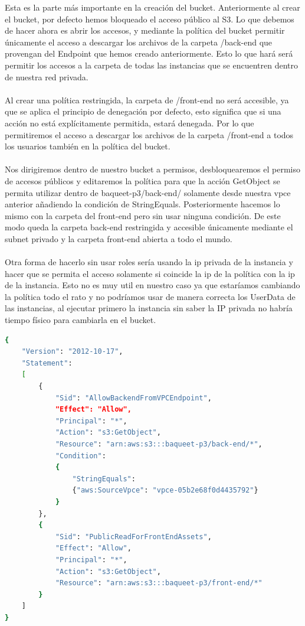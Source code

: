 \documentclass{article}
\begin{document}
	Esta es la parte más importante en la creación del bucket. Anteriormente al crear el bucket, por defecto hemos bloqueado el acceso público al S3. Lo que debemos de hacer ahora es abrir los accesos, y mediante la política del bucket permitir únicamente el acceso a descargar los archivos de la carpeta /back-end que provengan del Endpoint que hemos creado anteriormente. Esto lo que hará será permitir los accesos a la carpeta de todas las instancias que se encuentren dentro de nuestra red privada. 
	\\\\
	Al crear una política restringida, la carpeta de /front-end no será accesible, ya que se aplica el principio de denegación por defecto, esto significa que si una acción no está explícitamente permitida, estará denegada. Por lo que permitiremos el acceso a descargar los archivos de la carpeta /front-end a todos los usuarios también en la política del bucket.
	\\\\
	Nos dirigiremos dentro de nuestro bucket a permisos, desbloquearemos el permiso de accesos públicos y editaremos la política para que la acción GetObject se permita utilizar dentro de baqueet-p3/back-end/ solamente desde nuestra vpce anterior añadiendo la condición de StringEquals. Posteriormente hacemos lo mismo con la carpeta del front-end pero sin usar ninguna condición. De este modo queda la carpeta back-end restringida y accesible únicamente mediante el subnet privado y la carpeta front-end abierta a todo el mundo.
	\\\\
	Otra forma de hacerlo sin usar roles sería usando la ip privada de la instancia y hacer que se permita el acceso solamente si coincide la ip de la política con la ip de la instancia. Esto no es muy util en nuestro caso ya que estaríamos cambiando la política todo el rato y no podríamos usar de manera correcta los UserData de las instancias, al ejecutar primero la instancia sin saber la IP privada no habría tiempo físico para cambiarla en el bucket. 


	

	\begin{lstlisting}[style=consola, language=bash, caption={política-s3.json}]
{
    "Version": "2012-10-17",
    "Statement": 
    [
        {
            "Sid": "AllowBackendFromVPCEndpoint",
            "Effect": "Allow",
            "Principal": "*",
            "Action": "s3:GetObject",
            "Resource": "arn:aws:s3:::baqueet-p3/back-end/*",
            "Condition": 
            {
                "StringEquals": 
				{"aws:SourceVpce": "vpce-05b2e68f0d4435792"}
            }
        },
        {
            "Sid": "PublicReadForFrontEndAssets",
            "Effect": "Allow",
            "Principal": "*",
            "Action": "s3:GetObject",
            "Resource": "arn:aws:s3:::baqueet-p3/front-end/*"
        }
    ]
}\end{lstlisting}
\end{document}
